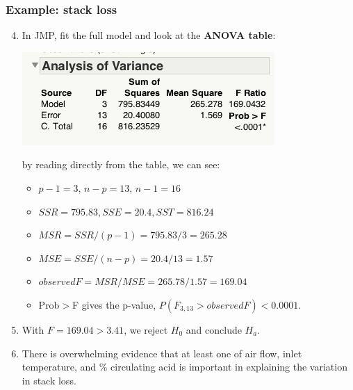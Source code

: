 \documentclass[handout]{beamer}\usepackage[]{graphicx}\usepackage[]{color}
\numberwithin{equation}{section}
\begin{document}
\begin{frame}
\frametitle{Example: stack loss} \scriptsize
\begin{enumerate}
\setcounter{enumi}{3}
\item In JMP, fit the full model and look at the {\bf ANOVA table}:
\begin{center}
 \includegraphics{../../fig/slfullanova1.png}
\end{center}
\pause by reading directly from the table, we can see: 
\begin{itemize}
\pause \item $p - 1 = 3$, $n - p = 13$, $n - 1 = 16$
\pause \item $SSR = 795.83, SSE = 20.4, SST = 816.24$
\pause \item $MSR = SSR/(p-1) = 795.83/3 = 265.28$
\pause \item $MSE = SSE/(n-p) = 20.4/13 = 1.57$
\pause \item $observed F = MSR/MSE = 265.78/1.57 = 169.04$
\pause \item Prob$>$F gives the p-value, $P( F_{3, 13} > observed F) < 0.0001$.
\end{itemize}
\pause \item With $F = 169.04 > 3.41$, we reject $H_0$ and conclude $H_a$.
\pause \item There is overwhelming evidence that at least one of air flow, inlet temperature, and \% circulating acid is important in explaining the variation in stack loss.
\end{enumerate}
\end{frame}
\end{document}

